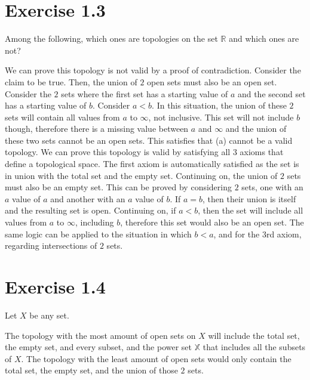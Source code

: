 \documentclass{report}
\begin{document}
\section{Exercise 1.3}
\begin{center}
    Among the following, which ones are topologies on the set $\mathbb{R}$ and which ones are not?
\end{center}

\bigskip
\sol We can prove this topology is not valid by a proof of contradiction. Consider the claim to be true. Then, the union of $2$ open sets must also be an open set. Consider the $2$ sets where the first set has a starting value of $a$ and the second set has a starting value of $b$. Consider $a < b$. In this situation, the union of these $2$ sets will contain all values from $a$ to $\infty$, not inclusive. This set will not include $b$ though, therefore there is a missing value between $a$ and $\infty$ and the union of these two sets cannot be an open sets. This satisfies that (a) cannot be a valid topology. 
\qs{1.3.b}{\[\tau = \{[a, \infty) \mid a \in \mathbb{R}\} \cup \{\emptyset, \mathbb{R}\}\].} 
\bigskip
\sol We can prove this topology is valid by satisfying all $3$ axioms that define a topological space. The first axiom is automatically satisfied as the set is in union with the total set and the empty set. Continuing on, the union of $2$ sets must also be an empty set. This can be proved by considering $2$ sets, one with an $a$ value of $a$ and another with an $a$ value of $b$. If $a = b$, then their union is itself and the resulting set is open. Continuing on, if $a < b$, then the set will include all values from $a$ to $\infty$, including $b$, therefore this set would also be an open set. The same logic can be applied to the situation in which $b < a$, and for the $3$rd axiom, regarding intersections of $2$ sets. 


\section{Exercise 1.4}
\begin{center}
Let $X$ be any set. 
\end{center}

\bigskip
\sol The topology with the most amount of open sets on $X$ will include the total set, the empty set, and every subset, and the power set $\mathbb{X}$ that includes all the subsets of $X$. 
\bigskip
{}
\bigskip
\sol The topology with the least amount of open sets would only contain the total set, the empty set, and the union of those $2$ sets.  
\newpage
\end{document}
